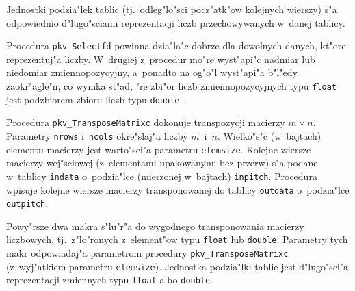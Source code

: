 Jednostki podzia"lek tablic (tj.\ odleg"lo"sci pocz"atk"ow kolejnych
wierszy) s"a odpowiednio d"lugo"sciami reprezentacji liczb przechowywanych
w~danej tablicy.

Procedura \texttt{pkv\_Selectfd} powinna dzia"la"c dobrze dla dowolnych
danych, kt"ore reprezentuj"a liczby. W~drugiej z~procedur mo"re wyst"api"c
nadmiar lub niedomiar zmiennopozycyjny, a~ponadto na og"o"l wyst"api"a
b"l"edy zaokr"agle"n, co wynika st"ad, "re zbi"or liczb
zmiennopozycyjnych typu \texttt{float} jest podzbiorem zbioru liczb typu
\texttt{double}.

\newpage
Procedura \texttt{pkv\_TransposeMatrixc} dokonuje transpozycji macierzy
$m\times n$. Parametry \texttt{nrows} i~\texttt{ncols} okre"slaj"a liczby
$m$~i~$n$. Wielko"s"c (w~bajtach) elementu macierzy jest warto"sci"a
parametru \texttt{elemsize}. Kolejne wiersze macierzy wej"sciowej
(z~elementami upakowanymi bez przerw) s"a podane w~tablicy \texttt{indata}
o~podzia"lce (mierzonej w~bajtach) \texttt{inpitch}. Procedura wpisuje
kolejne wiersze macierzy transponowanej do tablicy \texttt{outdata}
o~podzia"lce \texttt{outpitch}.

\vspace{\bigskipamount}
Powy"rsze dwa makra s"lu"r"a do wygodnego transponowania macierzy
liczbowych, tj.\ z"lo"ronych z~element"ow typu \texttt{float} lub
\texttt{double}. Parametry tych makr odpowiadaj"a parametrom procedury
\texttt{pkv\_TransposeMatrixc} (z~wyj"atkiem parametru \texttt{elemsize}).
Jednostka podzia"lki tablic jest d"lugo"sci"a reprezentacji zmiennych typu
\texttt{float} albo \texttt{double}. 


